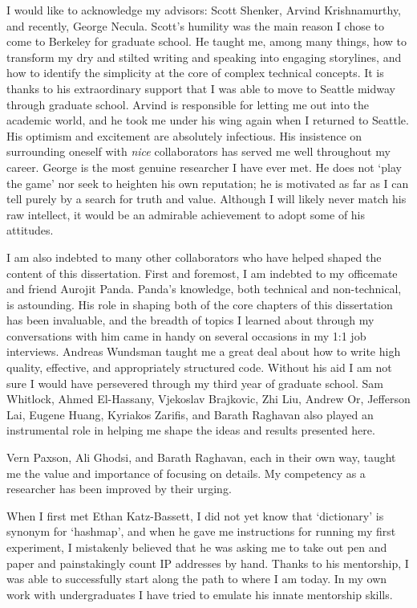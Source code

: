 \begin{acknowledgements}

I would like to acknowledge my advisors: Scott Shenker, Arvind
Krishnamurthy, and recently, George Necula. Scott's humility was the main reason I chose to
come to Berkeley for graduate school. He taught me, among many things, how to
transform my dry and stilted writing and speaking into engaging storylines,
and how to identify the simplicity at the core of complex technical
concepts. It is thanks to his extraordinary support that I was able to move to Seattle midway through
graduate school. Arvind is responsible for
letting me out into the academic world, and he took me under his wing again
when I returned to Seattle. His optimism and
excitement are absolutely infectious. His insistence on
surrounding
oneself with \textit{nice} collaborators has served me well throughout my
career. George is the most genuine researcher I have ever met. He does
not `play the game' nor seek to heighten his own reputation; he is motivated
as far as I can tell purely by a search for truth and value. Although I
will likely never match his raw intellect, it would be an admirable
achievement to adopt some of his attitudes.

I am also indebted to many other collaborators who have helped shaped the
content of this dissertation. First and foremost, I am indebted to my
officemate and friend Aurojit Panda. Panda's knowledge, both technical and non-technical,
is astounding. His role in shaping both of the core chapters of this
dissertation has been invaluable, and the breadth of
topics I learned about through my conversations with
him came in handy on several occasions in my 1:1 job interviews. Andreas Wundsman taught me a great deal about
how to write high quality, effective, and appropriately structured code.
Without his aid I am not sure I
would have persevered through my third year of graduate school. Sam Whitlock,
Ahmed El-Hassany, Vjekoslav Brajkovic, Zhi Liu, Andrew Or, Jefferson Lai,
Eugene Huang, Kyriakos Zarifis, and Barath Raghavan also played an
instrumental role in helping me shape the ideas and results presented here.

Vern Paxson, Ali Ghodsi, and Barath Raghavan, each in their own way, taught me
the value and importance of focusing on details. My competency as a researcher
has been improved by their urging.

When I first met Ethan Katz-Bassett, I did not yet know that `dictionary' is
synonym for `hashmap', and when he gave me instructions for running my first experiment,
I mistakenly believed that he was asking me to take
out pen and paper and painstakingly count IP addresses by hand. Thanks to his
mentorship, I was able to successfully start along the path to where I am today.
In my own work with undergraduates I have tried to emulate his innate
mentorship skills.


\end{acknowledgements}
